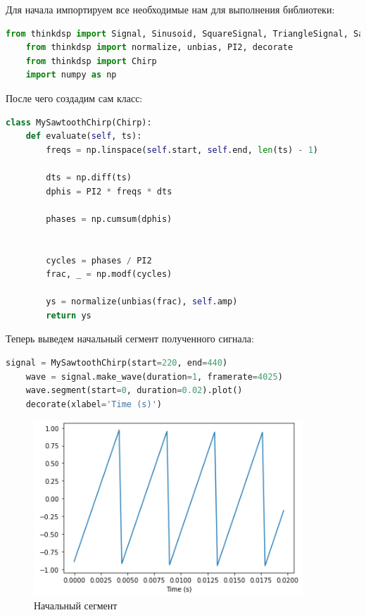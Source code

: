\documentclass[a4paper]{article}
\begin{document}
            Для начала импортируем все необходимые нам для выполнения библиотеки:
            
\begin{lstlisting}[language=Python, caption= Импорт библиотек]
    from thinkdsp import Signal, Sinusoid, SquareSignal, TriangleSignal, SawtoothSignal, ParabolicSignal
    from thinkdsp import normalize, unbias, PI2, decorate
    from thinkdsp import Chirp
    import numpy as np
\end{lstlisting}        
            
            После чего создадим сам класс:
            
\begin{lstlisting}[language=Python, caption= Класс \texttt{SawtoothChirp}]
    class MySawtoothChirp(Chirp):
    def evaluate(self, ts):
        freqs = np.linspace(self.start, self.end, len(ts) - 1)
        
        dts = np.diff(ts)
        dphis = PI2 * freqs * dts
        
        phases = np.cumsum(dphis)
        
        
        cycles = phases / PI2
        frac, _ = np.modf(cycles)

        ys = normalize(unbias(frac), self.amp)
        return ys
\end{lstlisting}      
            
            Теперь выведем начальный сегмент полученного сигнала:
            
\begin{lstlisting}[language=Python, caption= Получение начального сегмента]
    signal = MySawtoothChirp(start=220, end=440)
    wave = signal.make_wave(duration=1, framerate=4025)
    wave.segment(start=0, duration=0.02).plot() 
    decorate(xlabel='Time (s)')
\end{lstlisting}               
            
            \begin{figure}[H]
                \centering
                \includegraphics{ex_2_segment_begin.png}
                \caption{Начальный сегмент}
                \label{fig:ex_2_segment_begin}
            \end{figure}
            
\end{document}
